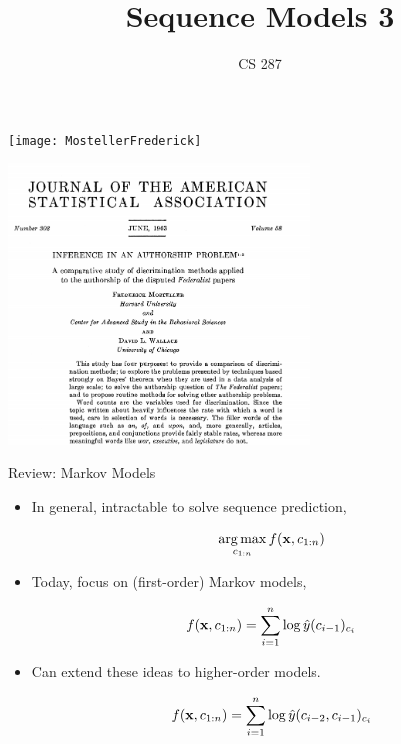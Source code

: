 \documentclass{beamer}
\title{Sequence Models 3}
\date{}
\author{CS 287}
\begin{document}
\begin{frame}
  \titlepage
\end{frame}

\begin{frame}
  \begin{center}
    \texttt{[image: MostellerFrederick]}
  \end{center}
\end{frame}


\begin{frame}
  \begin{center}
    \includegraphics[width=8cm]{mosteller}
  \end{center}
\end{frame}

\begin{frame}{Review: Markov Models}
  \begin{itemize}
  \item In general, intractable to solve sequence prediction,
 
  \[ \argmax_{c_{1:n}} f(\boldx, c_{1:n}) \] 

  \item Today, focus on (first-order) Markov models,

  \[ f(\mathbf{x}, c_{1:n})  = \sum_{i=1}^n \log \hat{y}(c_{i-1})_{c_i}\] 

  \item Can extend these ideas to higher-order models.

  \[ f(\mathbf{x}, c_{1:n})  = \sum_{i=1}^n \log \hat{y}(c_{i-2}, c_{i-1})_{c_i}\] 
  \end{itemize}  
  
\end{frame}
\end{document}
